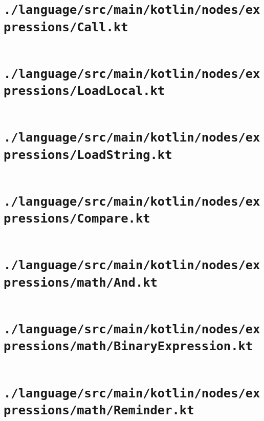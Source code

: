 \documentclass[a4paper, 11pt]{report}
\begin{document}
    \section{\lstinline{./language/src/main/kotlin/nodes/expressions/Call.kt}}
    \inputminted{kotlin}{./language/src/main/kotlin/nodes/expressions/Call.kt}


    \section{\lstinline{./language/src/main/kotlin/nodes/expressions/LoadLocal.kt}}
    \inputminted{kotlin}{./language/src/main/kotlin/nodes/expressions/LoadLocal.kt}


    \section{\lstinline{./language/src/main/kotlin/nodes/expressions/LoadString.kt}}
    \inputminted{kotlin}{./language/src/main/kotlin/nodes/expressions/LoadString.kt}


    \section{\lstinline{./language/src/main/kotlin/nodes/expressions/Compare.kt}}
    \inputminted{kotlin}{./language/src/main/kotlin/nodes/expressions/Compare.kt}


    \section{\lstinline{./language/src/main/kotlin/nodes/expressions/math/And.kt}}
    \inputminted{kotlin}{./language/src/main/kotlin/nodes/expressions/math/And.kt}


    \section{\lstinline{./language/src/main/kotlin/nodes/expressions/math/BinaryExpression.kt}}
    \inputminted{kotlin}{./language/src/main/kotlin/nodes/expressions/math/BinaryExpression.kt}


    \section{\lstinline{./language/src/main/kotlin/nodes/expressions/math/Reminder.kt}}
    \inputminted{kotlin}{./language/src/main/kotlin/nodes/expressions/math/Reminder.kt}
\end{document}
